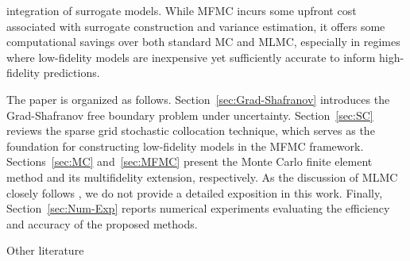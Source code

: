 integration of surrogate models. While MFMC incurs some upfront cost associated with surrogate construction and variance estimation, it offers some computational savings over both standard MC and MLMC, especially in regimes where low-fidelity models are inexpensive yet sufficiently accurate to inform high-fidelity predictions.



The paper is organized as follows. Section~\ref{sec:Grad-Shafranov} introduces the Grad-Shafranov free boundary problem under uncertainty. Section~\ref{sec:SC} reviews the sparse grid stochastic collocation technique, which serves as the foundation for constructing low-fidelity models in the MFMC framework. Sections~\ref{sec:MC} and~\ref{sec:MFMC} present the Monte Carlo finite element method and its multifidelity extension, respectively. As the discussion of MLMC closely follows \cite{ElLiSa:2025}, we do not provide a detailed exposition in this work. Finally, Section~\ref{sec:Num-Exp} reports numerical experiments evaluating the efficiency and accuracy of the proposed methods.

 
 Other literature
\cite{NAretz_MGunzburger_MMorlighem_KWillcox_2025a}
\cite{AAGorodetsky_GGeraci_MSEldred_JDJakeman_2020a}





